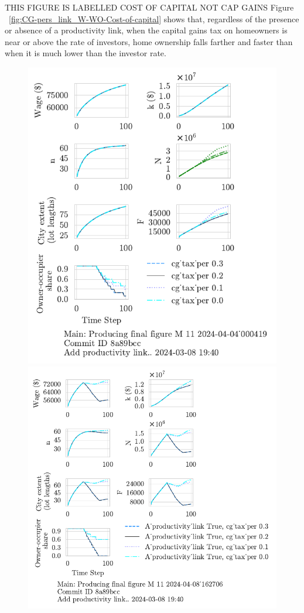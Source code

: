 {{\color{red} THIS FIGURE IS LABELLED COST OF CAPITAL NOT CAP GAINS Figure ~\ref{fig:CG-pers_link_W-WO-Cost-of-capital} } shows that, regardless of the presence or absence of a productivity link, when the capital gains tax on homeowners is near or above the rate of investors, %
home ownership falls farther and faster than when it is much lower than the investor rate. 
\begin{figure}[h!tb] 
    \centering
    \includegraphics[scale=.75, trim={0 1.4cm .5cm 0},clip]{fig/cg_tax_per-000419.pdf} 
    \includegraphics[scale=.75, trim={0 1.4cm 3.5cm 0},clip]{fig/link-cg_tax_per-4_162706.pdf}%

\end{figure}}
